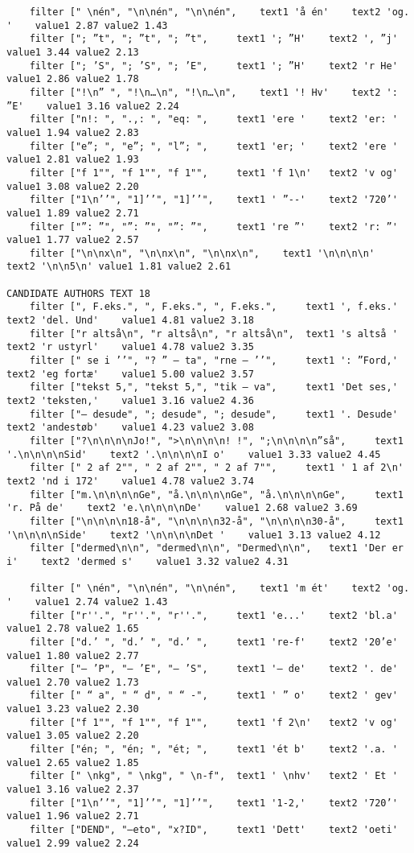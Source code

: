 {\begin{verbatim}
	filter [" \nén", "\n\nén", "\n\nén", 	text1 'å én'	text2 'og. '	value1 2.87	value2 1.43
	filter ["; ”t", "; ”t", "; ”t", 	text1 '; ”H'	text2 ', ”j'	value1 3.44	value2 2.13
	filter ["; ’S", "; ’S", "; ’E", 	text1 '; ”H'	text2 'r He'	value1 2.86	value2 1.78
	filter ["!\n” ", "!\n…\n", "!\n…\n", 	text1 '! Hv'	text2 ': ”E'	value1 3.16	value2 2.24
	filter ["n!: ", ".,: ", "eq: ", 	text1 'ere '	text2 'er: '	value1 1.94	value2 2.83
	filter ["e”; ", "e”; ", "l”; ", 	text1 'er; '	text2 'ere '	value1 2.81	value2 1.93
	filter ["f 1"", "f 1"", "f 1"", 	text1 'f 1\n'	text2 'v og'	value1 3.08	value2 2.20
	filter ["1\n’’", "1]’’", "1]’’", 	text1 ' ”--'	text2 '720’'	value1 1.89	value2 2.71
	filter ["”: ”", "”: ”", "”: ”", 	text1 're ”'	text2 'r: ”'	value1 1.77	value2 2.57
	filter ["\n\nx\n", "\n\nx\n", "\n\nx\n", 	text1 '\n\n\n\n'	text2 '\n\n5\n'	value1 1.81	value2 2.61

CANDIDATE AUTHORS TEXT 18
	filter [", F.eks.", ", F.eks.", ", F.eks.", 	text1 ', f.eks.'	text2 'del. Und'	value1 4.81	value2 3.18
	filter ["r altså\n", "r altså\n", "r altså\n", 	text1 's altså '	text2 'r ustyrl'	value1 4.78	value2 3.35
	filter [" se i ’’", "? ” – ta", "rne – ’’", 	text1 ': ”Ford,'	text2 'eg fortæ'	value1 5.00	value2 3.57
	filter ["tekst 5,", "tekst 5,", "tik – va", 	text1 'Det ses,'	text2 'teksten,'	value1 3.16	value2 4.36
	filter ["– desude", "; desude", "; desude", 	text1 '. Desude'	text2 'andestøb'	value1 4.23	value2 3.08
	filter ["?\n\n\n\nJo!", ">\n\n\n\n! !", ";\n\n\n\n”så", 	text1 '.\n\n\n\nSid'	text2 '.\n\n\n\nI o'	value1 3.33	value2 4.45
	filter [" 2 af 2"", " 2 af 2"", " 2 af 7"", 	text1 ' 1 af 2\n'	text2 'nd i 172'	value1 4.78	value2 3.74
	filter ["m.\n\n\n\nGe", "å.\n\n\n\nGe", "å.\n\n\n\nGe", 	text1 'r. På de'	text2 'e.\n\n\n\nDe'	value1 2.68	value2 3.69
	filter ["\n\n\n\n18-å", "\n\n\n\n32-å", "\n\n\n\n30-å", 	text1 '\n\n\n\nSide'	text2 '\n\n\n\nDet '	value1 3.13	value2 4.12
	filter ["dermed\n\n", "dermed\n\n", "Dermed\n\n", 	text1 'Der er i'	text2 'dermed s'	value1 3.32	value2 4.31

	filter [" \nén", "\n\nén", "\n\nén", 	text1 'm ét'	text2 'og. '	value1 2.74	value2 1.43
	filter ["r''.", "r''.", "r''.", 	text1 'e...'	text2 'bl.a'	value1 2.78	value2 1.65
	filter ["d.’ ", "d.’ ", "d.’ ", 	text1 're-f'	text2 '20’e'	value1 1.80	value2 2.77
	filter ["– ’P", "– ’E", "– ’S", 	text1 '– de'	text2 '. de'	value1 2.70	value2 1.73
	filter [" “ a", " “ d", " “ -", 	text1 ' ” o'	text2 ' gev'	value1 3.23	value2 2.30
	filter ["f 1"", "f 1"", "f 1"", 	text1 'f 2\n'	text2 'v og'	value1 3.05	value2 2.20
	filter ["én; ", "én; ", "ét; ", 	text1 'ét b'	text2 '.a. '	value1 2.65	value2 1.85
	filter [" \nkg", " \nkg", " \n-f", 	text1 ' \nhv'	text2 ' Et '	value1 3.16	value2 2.37
	filter ["1\n’’", "1]’’", "1]’’", 	text1 '1-2,'	text2 '720’'	value1 1.96	value2 2.71
	filter ["DEND", "–eto", "x?ID", 	text1 'Dett'	text2 'oeti'	value1 2.99	value2 2.24

\end{verbatim}
}

